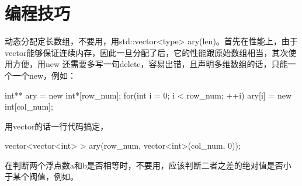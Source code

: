\chapter{编程技巧}

动态分配定长数组，不要用，用std::vector<type> ary(len)。首先在性能上，由于vector能够保证连续内存，因此一旦分配了后，它的性能跟原始数组相当，其次使用方便，用new 还需要多写一句delete，容易出错，且声明多维数组的话，只能一个一个new，例如：
\begin{Code}
int** ary = new int*[row_num];
for(int i = 0; i < row_num; ++i)
    ary[i] = new int[col_num];
\end{Code}
用vector的话一行代码搞定，
\begin{Code}
vector<vector<int> > ary(row_num, vector<int>(col_num, 0));
\end{Code}

在判断两个浮点数a和b是否相等时，不要用，应该判断二者之差的绝对值是否小于某个阀值，例如。

